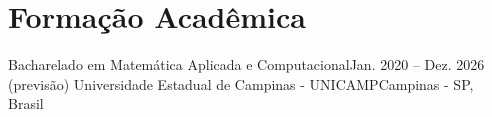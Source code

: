 \section{Formação Acadêmica}
\resumeSubHeadingListStart
  \resumeSubheading
    {Bacharelado em Matemática Aplicada e Computacional}{Jan. 2020 -- Dez. 2026 (previsão)}
    {Universidade Estadual de Campinas - UNICAMP}{Campinas - SP, Brasil}
    \resumeItemListStart
    \resumeItemListEnd
\resumeSubHeadingListEnd

